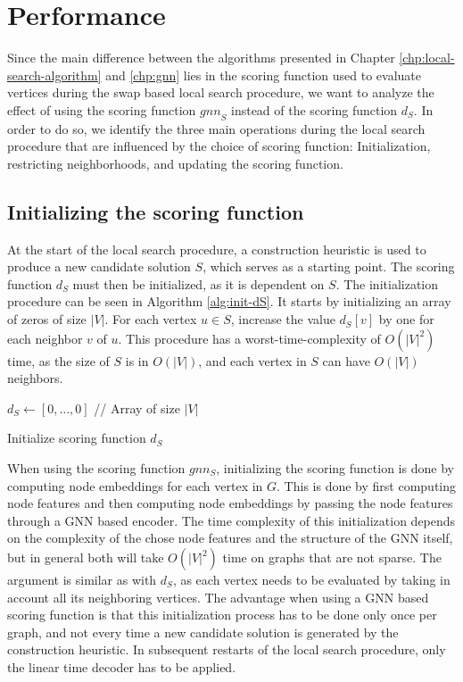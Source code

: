 \documentclass[draft,final]{vutinfth} %
\begin{document}
\section{Performance}\label{sec:performance}

Since the main difference between the algorithms presented in Chapter \ref{chp:local-search-algorithm} and \ref{chp:gnn} lies in the scoring function used to evaluate vertices during the swap based local search procedure, we want to analyze the effect of using the scoring function $\mathit{gnn}_S$ instead of the scoring function $d_S$. 
In order to do so, we identify the three main operations during the local search procedure that are influenced by the choice of scoring function: Initialization, restricting neighborhoods, and updating the scoring function.  

\subsection{Initializing the scoring function}
At the start of the local search procedure, a construction heuristic is used to produce a new candidate solution $S$, which serves as a starting point. 
The scoring function $d_S$ must then be initialized, as it is dependent on $S$. The initialization procedure can be seen in Algorithm \ref{alg:init-dS}.
It starts by initializing an array of zeros of size $|V|$. For each vertex $u \in S$, increase the value $d_S[v]$ by one for each neighbor $v$ of $u$. This procedure has a worst-time-complexity of $O(|V|^2)$ time, as the size of $S$ is in $O(|V|)$, and each vertex in $S$ can have $O(|V|)$ neighbors. 

\begin{algorithm}
    \DontPrintSemicolon
    $d_S \gets [0, \dots, 0]$ // Array of size $|V|$ \;
    \caption{Initialize scoring function $d_S$}
    \label{alg:init-dS}
\end{algorithm}

When using the scoring function $gnn_S$, initializing the scoring function is done by computing node embeddings for each vertex in $G$. This is done by first computing node features and then computing node embeddings by passing the node features through a GNN based encoder. The time complexity of this initialization depends on the complexity of the chose node features and the structure of the GNN itself, but in general both will take $O(|V|^2)$ time on graphs that are not sparse. The argument is similar as with $d_S$, as each vertex needs to be evaluated by taking in account all its neighboring vertices. 
The advantage when using a GNN based scoring function is that this initialization process has to be done only once per graph, and not every time a new candidate solution is generated by the construction heuristic. In subsequent restarts of the local search procedure, only the linear time decoder has to be applied. 
\end{document}
